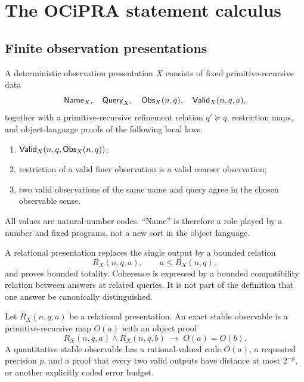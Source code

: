 \section{The OCiPRA statement calculus}

\subsection{Finite observation presentations}

\begin{definition}
A deterministic observation presentation \(X\) consists of fixed primitive-recursive data
\[
  \mathsf{Name}_X,\quad \mathsf{Query}_X,\quad
  \mathsf{Obs}_X(n,q),\quad \mathsf{Valid}_X(n,q,a),
\]
together with a primitive-recursive refinement relation \(q'\succeq q\), restriction maps, and object-language proofs of the following local laws:
\begin{enumerate}[label=(\roman*)]
  \item \(\mathsf{Valid}_X(n,q,\mathsf{Obs}_X(n,q))\);
  \item restriction of a valid finer observation is a valid coarser observation;
  \item two valid observations of the same name and query agree in the chosen observable sense.
\end{enumerate}
All values are natural-number codes.  ``Name'' is therefore a role played by a number and fixed programs, not a new sort in the object language.
\end{definition}

\begin{definition}
A relational presentation replaces the single output by a bounded relation
\[
  R_X(n,q,a),\qquad a\leq B_X(n,q),
\]
and proves bounded totality.  Coherence is expressed by a bounded compatibility relation between answers at related queries.  It is not part of the definition that one answer be canonically distinguished.
\end{definition}

\begin{definition}
Let \(R_X(n,q,a)\) be a relational presentation.  An exact stable observable is a primitive-recursive map \(O(a)\) with an object proof
\[
 R_X(n,q,a)\wedge R_X(n,q,b)\;\longrightarrow\;O(a)=O(b).
\]
A quantitative stable observable has a rational-valued code \(O(a)\), a requested precision \(p\), and a proof that every two valid outputs have distance at most \(2^{-p}\), or another explicitly coded error budget.
\end{definition}

